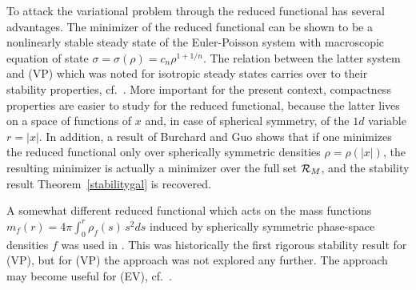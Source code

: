 \documentclass[11pt]{article}
\begin{document}
To attack the variational problem through the reduced functional
has several advantages. The minimizer of the reduced functional can be shown
to be a nonlinearly stable steady state of the Euler-Poisson system with
macroscopic equation of state $\sigma = \sigma(\rho) = c_n \rho^{1+1/n}$.
The relation between the latter system and (VP) which was noted for
isotropic steady states carries over to their stability properties,
cf.\ \cite{Rein03,Rein07}. More important for the present context,
compactness properties are easier to study for the reduced functional,
because the latter lives on a space of functions of $x$ and, in case
of spherical symmetry, of the $1d$ variable $r=|x|$. In addition, a result of
{\sc Burchard} and {\sc Guo} \cite[Thm.~1]{BG} shows that if one minimizes
the reduced functional only over spherically symmetric densities
$\rho=\rho(|x|)$, the resulting minimizer is actually a minimizer over the
full set ${\cal R}_M$, and the stability result Theorem~\ref{stabilitygal}
is recovered.

A somewhat different reduced functional which acts on the mass functions
$m_f(r)=4\pi \int_0^r \rho_f(s)\, s^2 ds$ induced by spherically symmetric
phase-space densities $f$ was used in \cite{Wo1}. This was historically
the first rigorous stability result for (VP), but for (VP) the approach
was not explored any further.
The approach may become useful for (EV), cf.~\cite{AnKu20,AnKu,Wo}.
\end{document}
